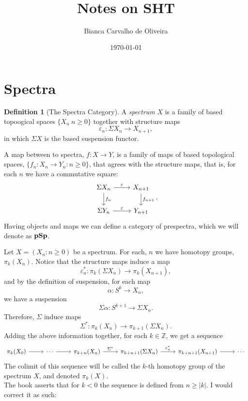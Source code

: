 \documentclass[a4paper,english,11pt]{article}
\title{Notes on SHT}
\author{Bianca Carvalho de Oliveira}
\date{\today}
\theoremstyle{definition}
\newtheorem{Def}{Definition}
\theoremstyle{plain}
\theoremstyle{remark}
\newcommand{\pSp}{\textbf{\text{pSp}}}
\begin{document}
\maketitle
\section{Spectra}
\begin{Def}[The Spectra Category]
    A \textit{spectrum} \(X\) is a family of based topoogical spaces \(\{X_n\:n\geq 0\}\) together with structure maps
    \[\varepsilon_n:\Sigma X_n\to X_{n+1},\]
    in which \(\Sigma X\) is the based suspension functor.

    A map between to spectra, \(f:X\to Y\), is a family of maps of based topological spaces, \(\{f_n:X_n\to Y_n:n\geq 0\}\), that agrees with the structure maps, that is, for each \(n\) we have a commutative square:
    \begin{equation*}
      \begin{tikzcd}
        \Sigma X_n \arrow{r}{\varepsilon}\arrow{d}{f_n}& X_{n+1}\arrow{d}{f_{n+1}}\\
        \Sigma Y_n \arrow{r}{\varepsilon}& Y_{n+1}
      \end{tikzcd}.
    \end{equation*}
    Having objects and maps we can define a category of prespectra, which we will denote as \(\pSp\). 
\end{Def}
Let \(X=(X_n:n\geq 0)\) be a spectrum. For each, \(n\) we have homotopy groups, \(\pi_k(X_n)\). Notice that the structure maps induce a map
\[\varepsilon_n^{\ast}:\pi_k(\Sigma X_n)\to\pi_k(X_{n+1}),\]
and by the definition of suspension, for each map
\[\alpha:S^k\to X_n,\]
we have a suspension
\[\Sigma\alpha:S^{k+1}\to \Sigma X_n.\]
Therefore, \(\Sigma\) induce maps
\[\Sigma^\ast:\pi_k(X_n)\to\pi_{k+1}(\Sigma X_n).\]
Adding the above information together, for each \(k\in\mathbb{Z}\), we get a sequence
\begin{equation*}
    \begin{tikzcd}
        \pi_k(X_0)\arrow{r}&\cdots\arrow{r}&\pi_{k+n}(X_n)\arrow{r}{\Sigma^\ast}&\pi_{k+n+1}(\Sigma X_n)\arrow{r}{\varepsilon_n^\ast}&\pi_{k+n+1}(X_{n+1})\arrow{r}&\cdots
    \end{tikzcd}
\end{equation*}
The colimit of this sequence will be called the \(k\)-th homotopy group of the spectrum \(X\), and denoted \(\pi_k(X)\).\\
The book asserts that for \(k<0\) the sequence is defined from \(n\geq|k|\). I would correct it as such: 
\end{document}
